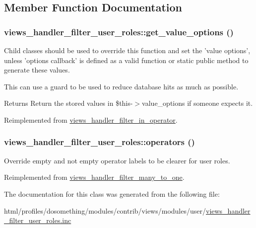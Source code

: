 \subsection{Member Function Documentation}
\hypertarget{classviews__handler__filter__user__roles_a9fcc092575dde958d1b50bb05c0243a3}{
\subsubsection[{get\_\-value\_\-options}]{\setlength{\rightskip}{0pt plus 5cm}views\_\-handler\_\-filter\_\-user\_\-roles::get\_\-value\_\-options ()}}
\label{classviews__handler__filter__user__roles_a9fcc092575dde958d1b50bb05c0243a3}
Child classes should be used to override this function and set the 'value options', unless 'options callback' is defined as a valid function or static public method to generate these values.

This can use a guard to be used to reduce database hits as much as possible.

\begin{DoxyReturn}{Returns}
Return the stored values in \$this-\/$>$value\_\-options if someone expects it. 
\end{DoxyReturn}


Reimplemented from \hyperlink{classviews__handler__filter__in__operator_aa5b5df6d90f4359ed28c0c446bdc81a6}{views\_\-handler\_\-filter\_\-in\_\-operator}.\hypertarget{classviews__handler__filter__user__roles_a9ec9e9b4e15492709ed2be2951dc6d19}{
\subsubsection[{operators}]{\setlength{\rightskip}{0pt plus 5cm}views\_\-handler\_\-filter\_\-user\_\-roles::operators ()}}
\label{classviews__handler__filter__user__roles_a9ec9e9b4e15492709ed2be2951dc6d19}
Override empty and not empty operator labels to be clearer for user roles. 

Reimplemented from \hyperlink{classviews__handler__filter__many__to__one_ae397d071d9f55b4053b88f01572e700f}{views\_\-handler\_\-filter\_\-many\_\-to\_\-one}.

The documentation for this class was generated from the following file:\begin{DoxyCompactItemize}
\item 
html/profiles/dosomething/modules/contrib/views/modules/user/\hyperlink{views__handler__filter__user__roles_8inc}{views\_\-handler\_\-filter\_\-user\_\-roles.inc}\end{DoxyCompactItemize}
